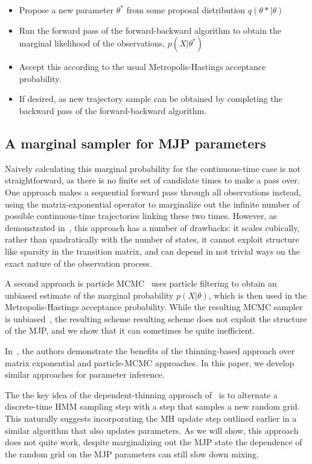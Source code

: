 \begin{itemize}
  \item Propose a new parameter $\theta^*$ from some proposal distribution
    $q(\theta*|\theta)$
  \item Run the forward pass of the forward-backward algorithm to 
    obtain the marginal likelihood of the observations, $p(X|\theta^*)$
  \item Accept this according to the usual Metropolis-Hastings acceptance
    probability.
  \item If desired, as new trajectory sample can be obtained by
    completing the backward pass of the forward-backward algorithm.
\end{itemize}

\subsection{A marginal sampler for MJP parameters} 
Naively calculating this marginal probability for the continuous-time
case is not straightforward, as there is no finite set of candidate
times to make a pass over. One approach makes a sequential forward
pass through all observations instead, using the matrix-exponential
operator to marginalize out the infinite number of possible 
continuous-time trajectories
linking these two times. However, as demonstrated in~\cite{RaoTeh13},
this approach has a number of drawbacks: it scales cubically, rather 
than quadratically with the number of states, it cannot exploit
structure like sparsity in the transition matrix, and can depend in
not trivial ways on the exact nature of the observation process.

A second approach is particle MCMC~\cite{Andrieu10} uses particle 
filtering to obtain an unbiased estimate of the marginal probability 
$p(X|\theta)$, which is then used in the Metropolis-Hastings 
acceptance probability. While the resulting MCMC sampler is 
unbiased~\cite{Andrieu09}, the resulting scheme resulting scheme
does not exploit the structure of the MJP, and we show that it
can sometimes be quite inefficient.

In~\cite{RaoTeh13, RaoTeh12}, the authors demonstrate the benefits of
the thinning-based approach over matrix exponential and
particle-MCMC approaches.
In this paper, we develop similar approaches for parameter inference.

The the key idea of the dependent-thinning approach of~\cite{RaoTeh13} is
to alternate a discrete-time HMM sampling step with a step that
samples a new random grid. This naturally suggests incorporating
the MH update step outlined earlier in a similar algorithm that also
updates parameters. As we will show, this approach does not quite
work, despite marginalizing out the MJP state the dependence of the
random grid on the MJP parameters can still slow down mixing.
